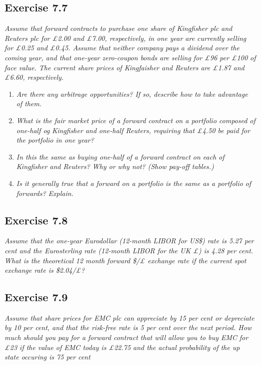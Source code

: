 \documentclass[]{book}
\theoremstyle{definition}
\theoremstyle{definition}
\theoremstyle{remark}
\begin{document}
\subsection{Exercise 7.7}\label{exercise-7.7}

\emph{Assume that forward contracts to purchase one share of Kingfisher
plc and Reuters plc for £2.00 and £7.00, respectively, in one year are
currently selling for £0.25 and £0.45. Assume that neither company pays
a dividend over the coming year, and that one-year zero-coupon bonds are
selling for £96 per £100 of face value. The current share prices of
Kingfaisher and Reuters are £1.87 and £6.60, respectively.}
\citep[p.236]{book}

\begin{enumerate}
\def\labelenumi{\alph{enumi}.}
\item
  \emph{Are there any arbitrage opportunities? If so, describe how to
  take advantage of them.} \citep[p.236]{book}
\item
  \emph{What is the fair market price of a forward contract on a
  portfolio composed of one-half og Kingfisher and one-half Reuters,
  requiring that £4.50 be paid for the portfolio in one year?}
  \citep[p.236]{book}
\item
  \emph{In this the same as buying one-half of a forward contract on
  each of Kingfisher and Reuters? Why or why not? (Show pay-off
  tables.)} \citep[p.236]{book}
\item
  \emph{Is it generally true that a forward on a portfolio is the same
  as a portfolio of forwards? Explain.} \citep[p.236]{book}
\end{enumerate}

\subsection{Exercise 7.8}\label{exercise-7.8}

\emph{Assume that the one-year Eurodollar (12-month LIBOR for US\$) rate
is 5.27 per cent and the Eurosterling rate (12-month LIBOR for the UK £)
is 4.28 per cent. What is the theoretical 12 month forward \$/£ exchange
rate if the current spot exchange rate is \$2.04/£?} \citep[p.236]{book}

\subsection{Exercise 7.9}\label{exercise-7.9}

\emph{Assume that share prices for EMC plc can appreciate by 15 per cent
or depreciate by 10 per cent, and that the risk-free rate is 5 per cent
over the next period. How much should you pay for a forward contract
that will allow you to buy EMC for £23 if the value of EMC today is
£22.75 and the actual probability of the up state occuring is 75 per
cent} \citep[p.236]{book}
\end{document}
